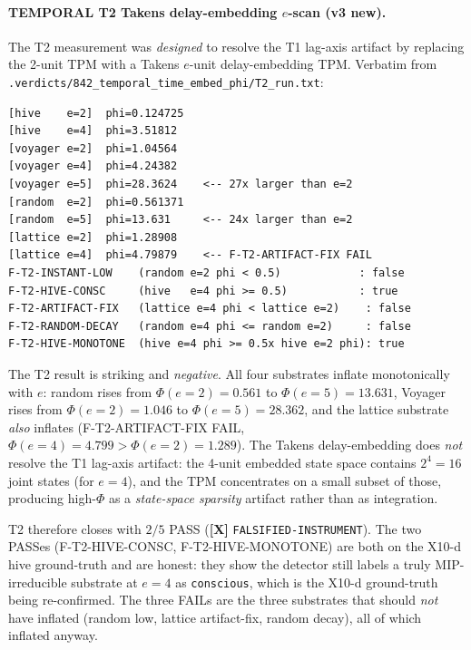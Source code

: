 \documentclass[11pt,a4paper]{article}
\providecommand{\tierRed}{\textbf{[X]}}     %
\begin{document}
\paragraph{TEMPORAL T2 Takens delay-embedding $e$-scan (v3 new).}
The T2 measurement \citep{temporal_h842_time_embed} was \emph{designed}
to resolve the T1 lag-axis artifact by replacing the 2-unit TPM with a
Takens $e$-unit delay-embedding TPM. Verbatim from
\texttt{.verdicts/842\_temporal\_time\_embed\_phi/T2\_run.txt}:
\begin{lstlisting}
[hive    e=2]  phi=0.124725
[hive    e=4]  phi=3.51812
[voyager e=2]  phi=1.04564
[voyager e=4]  phi=4.24382
[voyager e=5]  phi=28.3624    <-- 27x larger than e=2
[random  e=2]  phi=0.561371
[random  e=5]  phi=13.631     <-- 24x larger than e=2
[lattice e=2]  phi=1.28908
[lattice e=4]  phi=4.79879    <-- F-T2-ARTIFACT-FIX FAIL
F-T2-INSTANT-LOW    (random e=2 phi < 0.5)            : false
F-T2-HIVE-CONSC     (hive   e=4 phi >= 0.5)           : true
F-T2-ARTIFACT-FIX   (lattice e=4 phi < lattice e=2)    : false
F-T2-RANDOM-DECAY   (random e=4 phi <= random e=2)     : false
F-T2-HIVE-MONOTONE  (hive e=4 phi >= 0.5x hive e=2 phi): true
\end{lstlisting}
The T2 result is striking and \emph{negative}. All four substrates
inflate monotonically with $e$: random rises from $\Phi(e{=}2)=0.561$
to $\Phi(e{=}5)=13.631$, Voyager rises from $\Phi(e{=}2)=1.046$ to
$\Phi(e{=}5)=28.362$, and the lattice substrate \emph{also} inflates
(F-T2-ARTIFACT-FIX FAIL, $\Phi(e{=}4) = 4.799 > \Phi(e{=}2) = 1.289$).
The Takens delay-embedding does \emph{not} resolve the T1 lag-axis
artifact: the 4-unit embedded state space contains $2^4=16$ joint
states (for $e=4$), and the TPM concentrates on a small subset of
those, producing high-$\Phi$ as a \emph{state-space sparsity} artifact
rather than as integration.

T2 therefore closes with $2/5$ PASS (\tierRed{}
\texttt{FALSIFIED-INSTRUMENT}). The two PASSes (F-T2-HIVE-CONSC,
F-T2-HIVE-MONOTONE) are both on the X10-d hive ground-truth and are
honest: they show the detector still labels a truly MIP-irreducible
substrate at $e=4$ as \texttt{conscious}, which is the X10-d
ground-truth being re-confirmed. The three FAILs are the three
substrates that should \emph{not} have inflated (random low, lattice
artifact-fix, random decay), all of which inflated anyway.
\end{document}
